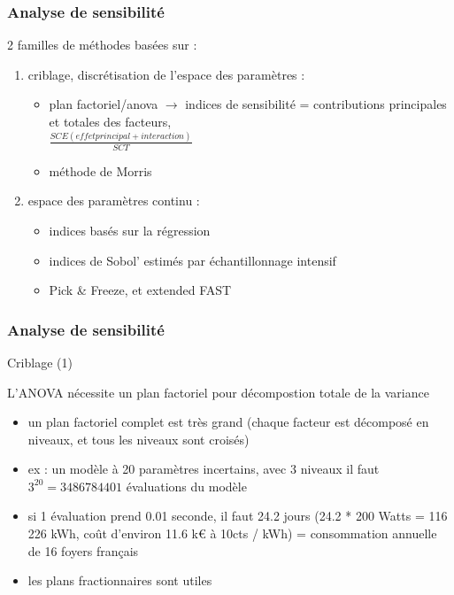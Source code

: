 \documentclass[10pt]{beamer}
\begin{document}
\begin{frame}
\frametitle{Analyse de sensibilité}

\bigskip
\bigskip

2 familles de méthodes basées sur :
\begin{enumerate}
	\item criblage, discrétisation de l'espace des paramètres :
	\begin{itemize}
		\item plan factoriel/anova $ \rightarrow $ indices de sensibilité = contributions principales et totales des facteurs,\\
		$ \frac{SCE(effet principal + interaction)}{SCT} $
		\item méthode de Morris
	\end{itemize}
	\item espace des paramètres continu :
	\begin{itemize}	
		\item indices basés sur la régression
		\item indices de Sobol' estimés par échantillonnage intensif
		\item Pick \& Freeze, et extended FAST
	\end{itemize}
\end{enumerate}

\end{frame}

\begin{frame}
\frametitle{Analyse de sensibilité}

\bigskip
\bigskip

Criblage (1)
\bigskip

L'ANOVA nécessite un plan factoriel pour décompostion totale de la variance
	\begin{itemize}
		\item un plan factoriel complet est très grand (chaque facteur est décomposé en niveaux, et tous les niveaux sont croisés)
		\item ex : un modèle à 20 paramètres incertains, avec 3 niveaux il faut $ 3^{20} = 3 486 784 401 $ évaluations du modèle
		\item si 1 évaluation prend 0.01 seconde, il faut 24.2 jours (24.2 * 200 Watts = 116 226 kWh, coût d'environ 11.6 k€ à 10cts / kWh) = consommation annuelle de 16 foyers français
		\item les plans fractionnaires sont utiles
	\end{itemize}



\end{frame}
\end{document}
